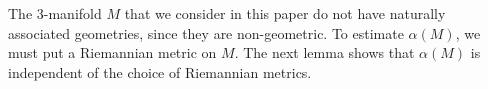 \documentclass{amsart}
\newcommand{\ra}{\rightarrow}
\newcommand{\lip}{\operatorname{Lip}}
\newcommand{\vol}{\operatorname{Vol}}
\newtheorem{lem}[thm]{Lemma}
\begin{document}








The 3-manifold $M$ that we consider in this paper do not have naturally associated geometries, since they are non-geometric.
To estimate $\alpha(M)$, we must put a Riemannian metric on $M$. The next lemma shows that $\alpha(M)$ is independent of 
the choice of Riemannian metrics.
\end{document}
